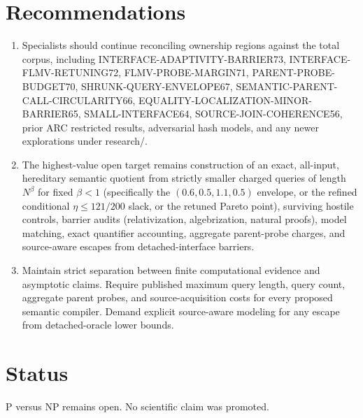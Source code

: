 \documentclass[11pt]{article}
\begin{document}
\section{Recommendations}
\begin{enumerate}
\item Specialists should continue reconciling ownership regions against the total corpus, including INTERFACE-ADAPTIVITY-BARRIER73, INTERFACE-FLMV-RETUNING72, FLMV-PROBE-MARGIN71, PARENT-PROBE-BUDGET70, SHRUNK-QUERY-ENVELOPE67, SEMANTIC-PARENT-CALL-CIRCULARITY66, EQUALITY-LOCALIZATION-MINOR-BARRIER65, SMALL-INTERFACE64, SOURCE-JOIN-COHERENCE56, prior ARC restricted results, adversarial hash models, and any newer explorations under research/.
\item The highest-value open target remains construction of an exact, all-input, hereditary semantic quotient from strictly smaller charged queries of length $N^\beta$ for fixed $\beta<1$ (specifically the $(0.6,0.5,1.1,0.5)$ envelope, or the refined conditional $\eta\le 121/200$ slack, or the retuned Pareto point), surviving hostile controls, barrier audits (relativization, algebrization, natural proofs), model matching, exact quantifier accounting, aggregate parent-probe charges, and source-aware escapes from detached-interface barriers.
\item Maintain strict separation between finite computational evidence and asymptotic claims. Require published maximum query length, query count, aggregate parent probes, and source-acquisition costs for every proposed semantic compiler. Demand explicit source-aware modeling for any escape from detached-oracle lower bounds.
\end{enumerate}

\section{Status}
P versus NP remains open. No scientific claim was promoted.

\end{document}
